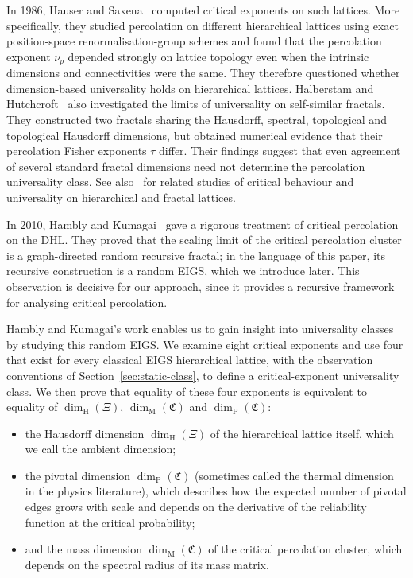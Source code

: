 \documentclass[scheme=plain,11pt]{ctexart}
\theoremstyle{definition}
\theoremstyle{remark}
\newcommand{\dimhaus}{\dim_{\mathrm H}}
\newcommand{\dimmass}{\dim_{\mathrm M}}
\begin{document}
In 1986, Hauser and Saxena~\cite{hauser1986geometrical} computed critical exponents on such lattices.
More specifically, they studied percolation on different hierarchical lattices using exact position-space renormalisa\-tion-group schemes and found that the percolation exponent $\nu_p$ depended strongly on lattice topology even when the intrinsic dimensions and connectivities were the same.
They therefore questioned whether dimension-based universality holds on hierarchical lattices.
Halberstam and Hutchcroft~\cite{halberstam2022what} also investigated the limits of universality on self-similar fractals.
They constructed two fractals sharing the Hausdorff, spectral, topological and topological Hausdorff dimensions, but obtained numerical evidence that their percolation Fisher exponents $\tau$ differ.
Their findings suggest that even agreement of several standard fractal dimensions need not determine the percolation universality class.
See also~\cites{gefen1980critical,havlin1983percolation,havlin1984percolation,hu1985problem} for related studies of critical behaviour and universality on hierarchical and fractal lattices.

In 2010, Hambly and Kumagai~\cite{hambly2010diffusion} gave a rigorous treatment of critical percolation on the DHL.
They proved that the scaling limit of the critical percolation cluster is a graph-directed random recursive fractal; in the language of this paper, its recursive construction is a random EIGS, which we introduce later.
This observation is decisive for our approach, since it provides a recursive framework for analysing critical percolation.

Hambly and Kumagai's work enables us to gain insight into universality classes by studying this random EIGS.
We examine eight critical exponents and use four that exist for every classical EIGS hierarchical lattice, with the observation conventions of Section~\ref{sec:static-class}, to define a critical-exponent universality class. We then prove that equality of these four exponents is equivalent to equality of $\dimhaus(\Xi)$, $\dimmass(\mathfrak C)$ and $\dim_{\mathrm P}(\mathfrak C)$:
\begin{itemize}
    \item the Hausdorff dimension $\dimhaus(\Xi)$ of the hierarchical lattice itself, which we call the ambient dimension;
    \item the pivotal dimension $\dim_{\mathrm P}(\mathfrak C)$ (sometimes called the thermal dimension in the physics literature), which describes how the expected number of pivotal edges grows with scale and depends on the derivative of the reliability function at the critical probability;
    \item and the mass dimension $\dimmass(\mathfrak C)$ of the critical percolation cluster, which depends on the spectral radius of its mass matrix.
\end{itemize}
\end{document}
